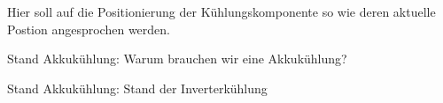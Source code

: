 Hier soll auf die Positionierung der Kühlungskomponente so wie deren aktuelle Postion angesprochen werden.


Stand Akkukühlung:
Warum brauchen wir eine Akkukühlung?

Stand Akkukühlung:
Stand der Inverterkühlung
